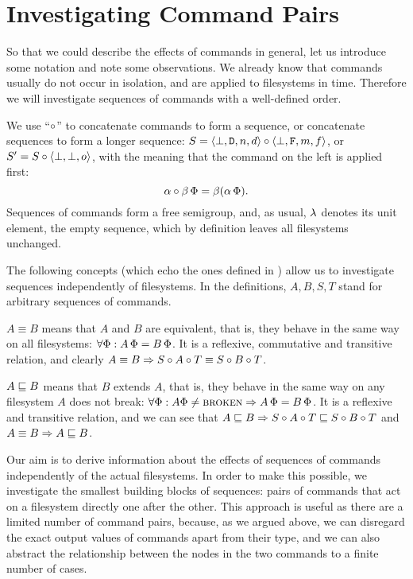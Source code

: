 

\section{Investigating Command Pairs}\label{section_axioms}

So that we could describe the effects of commands in general,
let us introduce some notation
and note some observations.
We already know that
commands usually do not occur in isolation,
and are applied to filesystems in time.
Therefore we will investigate sequences of commands with a well-defined order.
\begin{mydef}
We use ``$\circ$'' to concatenate commands to form a sequence, or concatenate sequences to form a longer sequence:
$S=\langle{\bot,\mathtt{D},n,d}\rangle\circ\langle{\bot,\mathtt{F},m,f}\rangle$, or $S'=S\circ\langle{\bot,\bot,o}\rangle$,
with the meaning that the command on the left is applied first:
\[ \alpha\circ\beta\,\Phi = \beta(\alpha\,\Phi). \]
Sequences of commands form a free semigroup, and, as usual,
$\lambda$ denotes its unit element, the empty sequence,
which by definition leaves all filesystems unchanged.
\end{mydef}

The following concepts 
(which echo the ones defined in \cite{NREC})
allow us to investigate sequences independently of filesystems.
In the definitions, $A,B,S,T$ stand for arbitrary sequences of commands.

\begin{mydef}[$\equiv$]
$A\equiv B$ means that $A$ and $B$ are equivalent,
that is, they behave in the same way on
all filesystems: $\forall \Phi: A\,\Phi=B\,\Phi$.
It is a reflexive, commutative and transitive relation,
and clearly
$ A\equiv B \Rightarrow S\circ A\circ T\equiv S\circ B\circ T $.
\end{mydef}

\begin{mydef}[$\eqext$]
$A\sqsubseteq B$ means that $B$ extends $A$,
that is, they behave in the same way
on any filesystem $A$ does not break:
$\forall \Phi: A\Phi\neq\text{\normalfont\scshape{broken}}\Rightarrow A\,\Phi=B\,\Phi$.
It is a reflexive and transitive relation,
and we can see that
$ A\sqsubseteq B \Rightarrow S\circ A\circ T\sqsubseteq S\circ B\circ T$
and
$ A\equiv B \Rightarrow A\sqsubseteq B$.
\end{mydef}

Our aim is to derive information about the effects of sequences
of commands independently of the actual filesystems.
In order to make this possible, we investigate the smallest building
blocks of sequences: pairs of commands that act on a filesystem directly one after the other.
This approach is useful as there are a limited number of command pairs,
because, as we argued above, we can disregard the exact output values of commands apart from their type,
and we can also abstract the relationship between the nodes in the two commands
to a finite number of cases.

